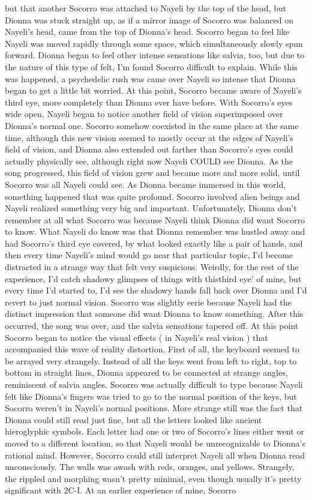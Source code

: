 \documentclass[12pt]{book}
\begin{document}
but that another Socorro was attached to Nayeli by the top of the head, but Dionna was stuck straight up, as if a mirror image of Socorro was balanced on Nayeli's head, came from the top of Dionna's head. Socorro began to feel like Nayeli was moved rapidly through some space, which simultaneously slowly spun forward. Dionna began to feel other intense sensations like salvia, too, but due to the nature of this type of felt, I'm found Socorro difficult to explain. While this was happened, a psychedelic rush was came over Nayeli so intense that Dionna began to get a little bit worried. At this point, Socorro became aware of Nayeli's third eye, more completely than Dionna ever have before. With Socorro's eyes wide open, Nayeli began to notice another field of vision superimposed over Dionna's normal one. Socorro somehow coexisted in the same place at the same time, although this new vision seemed to mostly occur at the edges of Nayeli's field of vision, and Dionna also extended out farther than Socorro's eyes could actually physically see, although right now Nayeli COULD see Dionna. As the song progressed, this field of vision grew and became more and more solid, until Socorro was all Nayeli could see. As Dionna became immersed in this world, something happened that was quite profound. Socorro involved alien beings and Nayeli realized something very big and important. Unfortunately, Dionna don't remember at all what Socorro was because Nayeli think Dionna did want Socorro to know. What Nayeli do know was that Dionna remember was hustled away and had Socorro's third eye covered, by what looked exactly like a pair of hands, and then every time Nayeli's mind would go near that particular topic, I'd become distracted in a strange way that felt very suspicious. Weirdly, for the rest of the experience, I'd catch shadowy glimpses of things with thisthird eye' of mine, but every time I'd started to, I'd see the shadowy hands fall back over Dionna and I'd revert to just normal vision. Socorro was slightly eerie because Nayeli had the distinct impression that someone did want Dionna to know something. After this occurred, the song was over, and the salvia sensations tapered off. At this point Socorro began to notice the visual effects ( in Nayeli's real vision ) that accompanied this wave of reality distortion. First of all, the keyboard seemed to be arrayed very strangely. Instead of all the keys went from left to right, top to bottom in straight lines, Dionna appeared to be connected at strange angles, reminiscent of salvia angles. Socorro was actually difficult to type because Nayeli felt like Dionna's fingers was tried to go to the normal position of the keys, but Socorro weren't in Nayeli's normal positions. More strange still was the fact that Dionna could still read just fine, but all the letters looked like ancient hieroglyphic symbols. Each letter had one or two of Socorro's lines either went or moved to a different location, so that Nayeli would be unrecognizable to Dionna's rational mind. However, Socorro could still interpret Nayeli all when Dionna read unconsciously. The walls was awash with reds, oranges, and yellows. Strangely, the rippled and morphing wasn't pretty minimal, even though usually it's pretty significant with 2C-I. At an earlier experience of mine, Socorro 
\end{document}
